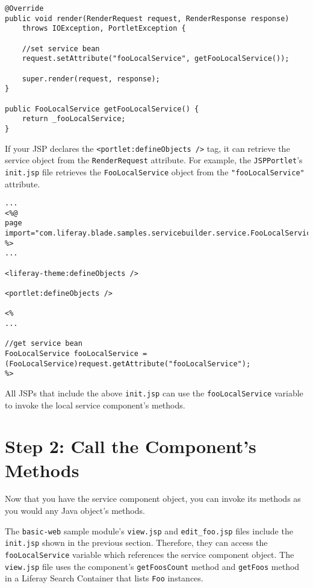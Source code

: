 \begin{verbatim}
@Override
public void render(RenderRequest request, RenderResponse response)
    throws IOException, PortletException {

    //set service bean
    request.setAttribute("fooLocalService", getFooLocalService());

    super.render(request, response);
}

public FooLocalService getFooLocalService() {
    return _fooLocalService;
}
\end{verbatim}

If your JSP declares the
\texttt{\textless{}portlet:defineObjects\ /\textgreater{}} tag, it can
retrieve the service object from the \texttt{RenderRequest} attribute.
For example, the \texttt{JSPPortlet}'s \texttt{init.jsp} file retrieves
the \texttt{FooLocalService} object from the \texttt{"fooLocalService"}
attribute.

\begin{verbatim}
...
<%@
page import="com.liferay.blade.samples.servicebuilder.service.FooLocalService" %>
...

<liferay-theme:defineObjects />

<portlet:defineObjects />

<%
...

//get service bean
FooLocalService fooLocalService = (FooLocalService)request.getAttribute("fooLocalService");
%>
\end{verbatim}

All JSPs that include the above \texttt{init.jsp} can use the
\texttt{fooLocalService} variable to invoke the local service
component's methods.

\section{Step 2: Call the Component's
Methods}\label{step-2-call-the-components-methods}

Now that you have the service component object, you can invoke its
methods as you would any Java object's methods.

The \texttt{basic-web} sample module's \texttt{view.jsp} and
\texttt{edit\_foo.jsp} files include the \texttt{init.jsp} shown in the
previous section. Therefore, they can access the
\texttt{fooLocalService} variable which references the service component
object. The \texttt{view.jsp} file uses the component's
\texttt{getFoosCount} method and \texttt{getFoos} method in a Liferay
Search Container that lists \texttt{Foo} instances.

